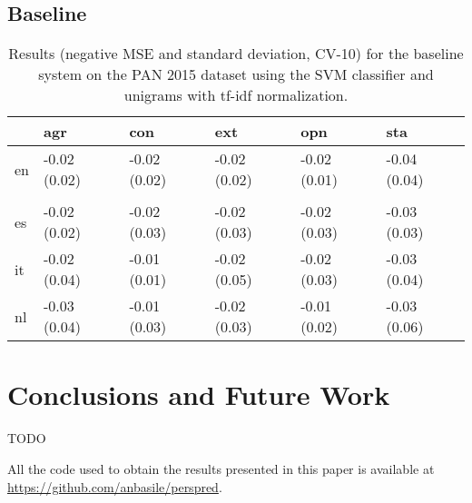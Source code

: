 \documentclass[article,11pt,nofixltx2e]{article}
\begin{document}
\subsection{Baseline}
\label{sec-5-1}

\begin{table*}[htb]
\caption{\label{tab:baseline-pan2015}Results (negative MSE and standard deviation, CV-10) for the baseline system on the PAN 2015 dataset using the SVM classifier and unigrams with tf-idf normalization.}
\centering
\begin{tabular}{llllll}
 & agr & con & ext & opn & sta\\
\hline
en & -0.02 (0.02) & -0.02 (0.02) & -0.02 (0.02) & -0.02 (0.01) & -0.04 (0.04)\\
 &  &  &  &  & \\
\hline
es & -0.02 (0.02) & -0.02 (0.03) & -0.02 (0.03) & -0.02 (0.03) & -0.03 (0.03)\\
\hline
it & -0.02 (0.04) & -0.01 (0.01) & -0.02 (0.05) & -0.02 (0.03) & -0.03 (0.04)\\
\hline
nl & -0.03 (0.04) & -0.01 (0.03) & -0.02 (0.03) & -0.01 (0.02) & -0.03 (0.06)\\
\end{tabular}
\end{table*}


\section{Conclusions and Future Work}
\label{sec-6}

TODO

All the code used to obtain the results presented in this paper is available at \url{https://github.com/anbasile/perspred}.
\end{document}
